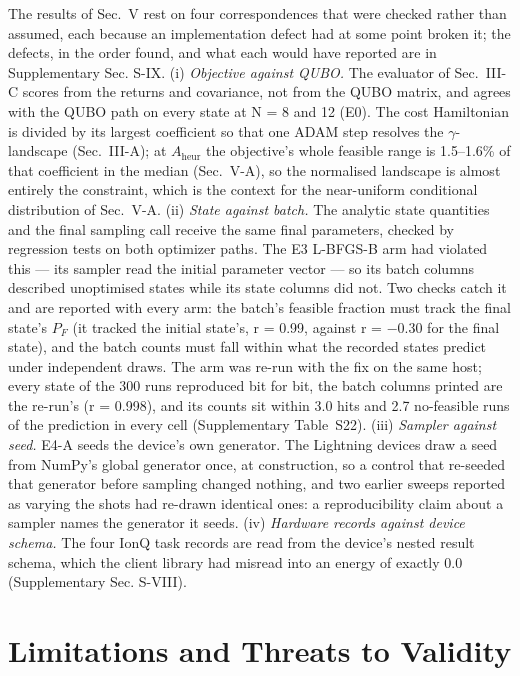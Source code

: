 \documentclass{ieeeaccess}
\begin{document}
The results of Sec.~V rest on four correspondences that were checked rather than assumed, each because an implementation defect had at some point broken it; the defects, in the order found, and what each would have reported are in Supplementary Sec. S-IX. (i) \textit{Objective against QUBO.} The evaluator of Sec.~III-C scores from the returns and covariance, not from the QUBO matrix, and agrees with the QUBO path on every state at N = 8 and 12 (E0). The cost Hamiltonian is divided by its largest coefficient so that one ADAM step resolves the $\gamma$-landscape (Sec.~III-A); at $A_{\mathrm{heur}}$ the objective's whole feasible range is 1.5--1.6\% of that coefficient in the median (Sec.~V-A), so the normalised landscape is almost entirely the constraint, which is the context for the near-uniform conditional distribution of Sec.~V-A. (ii) \textit{State against batch.} The analytic state quantities and the final sampling call receive the same final parameters, checked by regression tests on both optimizer paths. The E3 L-BFGS-B arm had violated this --- its sampler read the initial parameter vector --- so its batch columns described unoptimised states while its state columns did not. Two checks catch it and are reported with every arm: the batch's feasible fraction must track the final state's $P_{F}$ (it tracked the initial state's, r = 0.99, against r = $-$0.30 for the final state), and the batch counts must fall within what the recorded states predict under independent draws. The arm was re-run with the fix on the same host; every state of the 300 runs reproduced bit for bit, the batch columns printed are the re-run's (r = 0.998), and its counts sit within 3.0 hits and 2.7 no-feasible runs of the prediction in every cell (Supplementary Table~S22). (iii) \textit{Sampler against seed.} E4-A seeds the device's own generator. The Lightning devices draw a seed from NumPy's global generator once, at construction, so a control that re-seeded that generator before sampling changed nothing, and two earlier sweeps reported as varying the shots had re-drawn identical ones: a reproducibility claim about a sampler names the generator it seeds. (iv) \textit{Hardware records against device schema.} The four IonQ task records are read from the device's nested result schema, which the client library had misread into an energy of exactly 0.0 (Supplementary Sec. S-VIII).


\section{Limitations and Threats to Validity}
\end{document}
